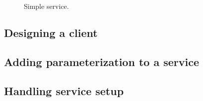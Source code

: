 \begin{figure}[h]
  \begin{center}
    
    \caption{\label{fig:simple_service} Simple service.}
  \end{center}
\end{figure}


\subsection{Designing a client}

\subsection{Adding parameterization to a service}

\subsection{Handling service setup}


%     


%     
